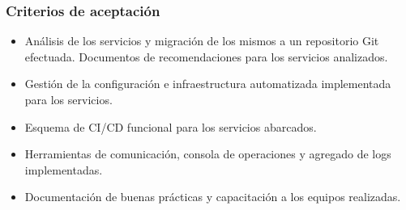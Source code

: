 \subsubsection{Criterios de aceptación}

\begin{itemize}
\item Análisis de los servicios y migración de los mismos a un repositorio Git efectuada. Documentos de recomendaciones para los servicios analizados.
\item Gestión de la configuración e infraestructura automatizada implementada para los servicios.
\item Esquema de CI/CD funcional para los servicios abarcados.
\item Herramientas de comunicación, consola de operaciones y agregado de logs implementadas.
\item Documentación de buenas prácticas y capacitación a los equipos realizadas.
\end{itemize}
\newpage


